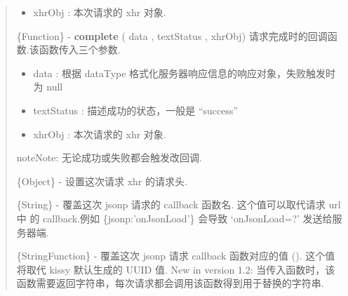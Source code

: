 \documentclass[letterpaper,10pt,english]{sphinxmanual}
\begin{document}
\begin{quote}
\begin{fulllineitems}
\begin{itemize}
\item {}
xhrObj : 本次请求的 xhr 对象.

\end{itemize}

\end{fulllineitems}



\begin{fulllineitems}
\label{api/core/ajax/io:io.cfg.complete}
\{Function\} -  \textbf{complete} ( data , textStatus , xhrObj) 请求完成时的回调函数.该函数传入三个参数.
\begin{itemize}
\item {}
data : 根据 dataType 格式化服务器响应信息的响应对象，失败触发时为 null

\item {}
textStatus : 描述成功的状态，一般是 ``success''

\item {}
xhrObj : 本次请求的 xhr 对象.

\end{itemize}

\begin{notice}{note}{Note:}
无论成功或失败都会触发改回调.
\end{notice}

\end{fulllineitems}



\begin{fulllineitems}
\label{api/core/ajax/io:io.cfg.headers}
\{Object\} -  设置这次请求 xhr 的请求头.

\end{fulllineitems}



\begin{fulllineitems}
\label{api/core/ajax/io:io.cfg.jsonp}
\{String\} -  覆盖这次 jsonp 请求的 callback 函数名. 这个值可以取代请求 url 中  的 callback.例如   \{jsonp:'onJsonLoad'\} 会导致 `onJsonLoad=?' 发送给服务器端.

\end{fulllineitems}



\begin{fulllineitems}
\label{api/core/ajax/io:io.cfg.jsonpCallback}
\{String\textbar{}Function\} - 覆盖这次 jsonp 请求 callback 函数对应的值 (). 这个值将取代 kissy 默认生成的 UUID 值.
New in version 1.2: 当传入函数时，该函数需要返回字符串，每次请求都会调用该函数得到用于替换的字符串.
\end{fulllineitems}



\end{quote}
\end{document}
